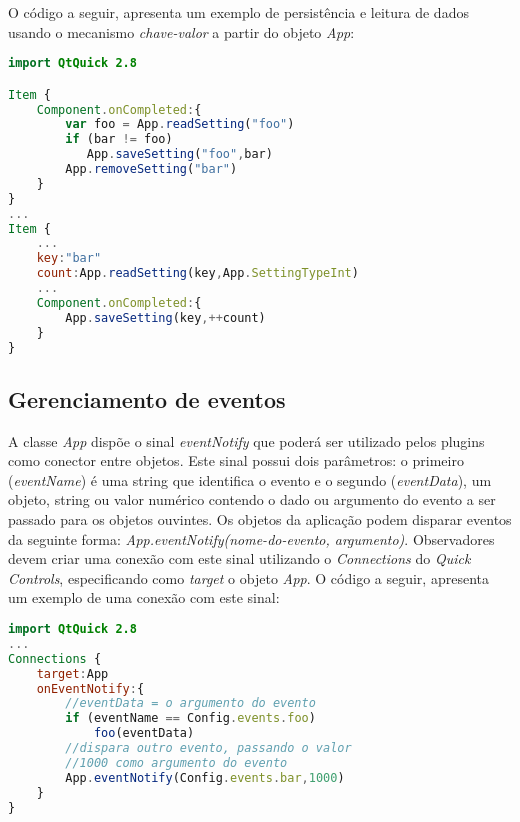 O código a seguir, apresenta um exemplo de persistência e leitura de dados usando o mecanismo \textit{chave-valor} a partir do objeto \textit{App}:

\begin{center}
\begin{lstlisting}[language=qml]
import QtQuick 2.8

Item {
    Component.onCompleted:{
		var foo = App.readSetting("foo")
		if (bar != foo)
		   App.saveSetting("foo",bar)
		App.removeSetting("bar")
    }
}
...
Item {
	...
	key:"bar"
	count:App.readSetting(key,App.SettingTypeInt)
	...
	Component.onCompleted:{ 
		App.saveSetting(key,++count)
	}
}
\end{lstlisting}
\end{center}


\subsection{Gerenciamento de eventos}
A classe \textit{App} dispõe o sinal \textit{eventNotify} que poderá ser utilizado pelos plugins como conector entre objetos. Este sinal possui dois parâmetros: o primeiro (\textit{eventName}) é uma string que identifica o evento e o segundo (\textit{eventData}), um objeto, string ou valor numérico contendo o dado ou argumento do evento a ser passado para os objetos ouvintes. Os objetos da aplicação podem disparar eventos da seguinte forma: \textit{App.eventNotify(nome-do-evento, argumento)}. Observadores devem criar uma conexão com este sinal utilizando o \textit{Connections} do \textit{Quick Controls}, especificando como \textit{target} o objeto \textit{App}. O código a seguir, apresenta um exemplo de uma conexão com este sinal:

\begin{center}
\begin{lstlisting}[language=qml]
import QtQuick 2.8
...
Connections {
    target:App
    onEventNotify:{
    	//eventData = o argumento do evento
        if (eventName == Config.events.foo)
            foo(eventData)
        //dispara outro evento, passando o valor
        //1000 como argumento do evento
        App.eventNotify(Config.events.bar,1000)
    }
}
\end{lstlisting}
\end{center}


